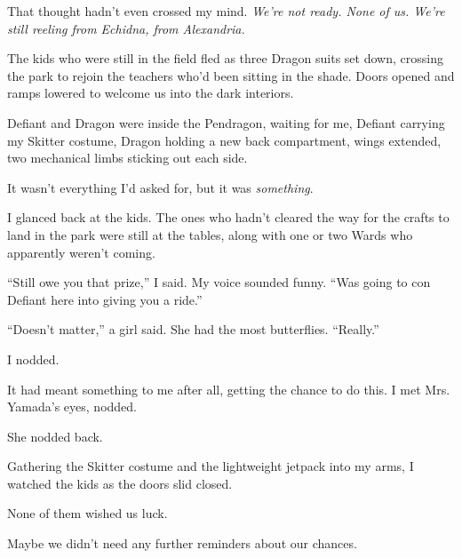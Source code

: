 That thought hadn't even crossed my mind.  \emph{We're not ready.  None of us.  We're still reeling from Echidna, from Alexandria.}



The kids who were still in the field fled as three Dragon suits set down, crossing the park to rejoin the teachers who'd been sitting in the shade.  Doors opened and ramps lowered to welcome us into the dark interiors.



Defiant and Dragon were inside the Pendragon, waiting for me, Defiant carrying my Skitter costume, Dragon holding a new back compartment, wings extended, two mechanical limbs sticking out each side.



It wasn't everything I'd asked for, but it was \emph{something}.



I glanced back at the kids. The ones who hadn't cleared the way for the crafts to land in the park were still at the tables, along with one or two Wards who apparently weren't coming.



``Still owe you that prize,'' I said.  My voice sounded funny.  ``Was going to con Defiant here into giving you a ride.''



``Doesn't matter,'' a girl said.  She had the most butterflies.  ``Really.''



I nodded.



It had meant something to me after all, getting the chance to do this.  I met Mrs. Yamada's eyes, nodded.



She nodded back.



Gathering the Skitter costume and the lightweight jetpack into my arms, I watched the kids as the doors slid closed.



None of them wished us luck.



Maybe we didn't need any further reminders about our chances.





